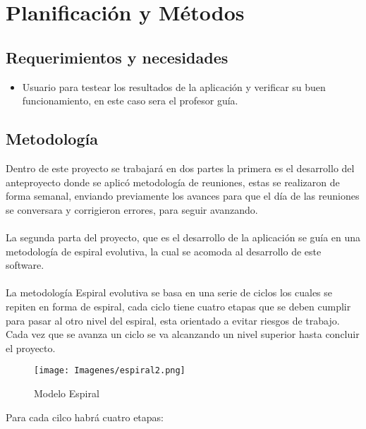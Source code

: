 \documentclass[14pt]{article}
\begin{document}
\newpage

	\section{Planificación y Métodos}
	\subsection{Requerimientos y necesidades}
\begin{itemize}
\item Usuario para testear los resultados de la aplicación y verificar su buen funcionamiento, en este caso sera el profesor guía.

\end{itemize}

	\subsection{Metodología}
Dentro de este proyecto se trabajará en dos partes la primera es el desarrollo del anteproyecto donde se aplicó metodología de reuniones, estas se realizaron de forma semanal, enviando previamente los avances para que el día de las reuniones  se conversara y corrigieron  errores, para  seguir avanzando. 
		\\~\\
La segunda parta del proyecto, que es el desarrollo de la aplicación se guía en una  metodología de espiral evolutiva, la cual se acomoda al desarrollo de este software.
		\\~\\
La metodología Espiral evolutiva se basa en una serie de ciclos los cuales se repiten en forma de espiral, cada ciclo tiene cuatro etapas que se deben cumplir para pasar al otro nivel del espiral, esta orientado a evitar riesgos de trabajo. Cada vez que se avanza un ciclo se va alcanzando un nivel superior hasta concluir el proyecto.		
	\begin{figure}[h]
					\begin{center}
						\texttt{[image: Imagenes/espiral2.png]}
						\caption{Modelo Espiral}\label{figura:Anteproyecto}	
					\end{center}
	\end{figure}		

Para cada cilco habrá cuatro etapas:
\end{document}
